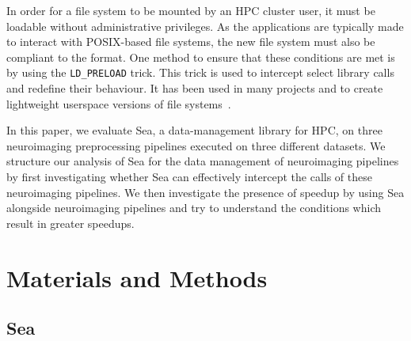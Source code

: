     In order for a file system to be mounted by an HPC cluster user, it must be
    loadable without administrative privileges. As the applications are
    typically made to interact with POSIX-based file systems, the new file
    system must also be compliant to the format. One method to ensure that these
    conditions are met is by using the \texttt{LD\_PRELOAD} trick. This trick is
    used to intercept select library calls and redefine their behaviour. It has
    been used in many projects and to create lightweight userspace versions of
    file systems~\cite{xtreemfs,burstfs,gekkofs}. 
    
    In this paper, we evaluate Sea, a data-management library for HPC, on three neuroimaging preprocessing pipelines
    executed on three different datasets. We structure our analysis of Sea for the data management of
    neuroimaging pipelines by first investigating whether Sea can effectively intercept the calls of these neuroimaging pipelines.
    We then investigate the presence of speedup by using Sea alongside neuroimaging pipelines and try to understand the conditions
    which result in greater speedups.
    
    
    
    
    
    
    \section{Materials and Methods}
    
    \subsection{Sea}
    
